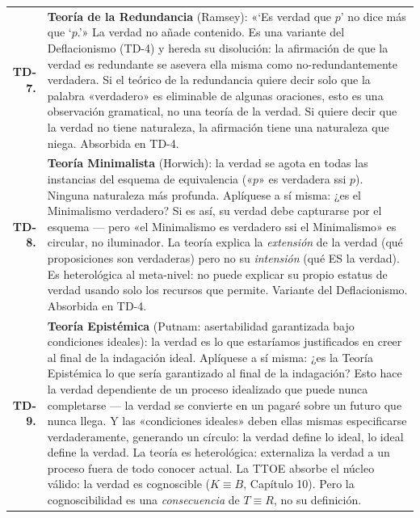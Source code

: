 \documentclass[10pt, openany, oneside]{book}
\renewcommand{\footnotesize}{\fontsize{8.5}{11}\selectfont}
\begin{document}
{\footnotesize
\noindent\begin{tabular}{r p{}}
\textbf{TD-7.} & \textbf{Teoría de la Redundancia} (Ramsey): «`Es verdad que $p$' no dice más que `$p$.'» La verdad no añade contenido. Es una variante del Deflacionismo (TD-4) y hereda su disolución: la afirmación de que la verdad es redundante se asevera ella misma como no-redundantemente verdadera. Si el teórico de la redundancia quiere decir solo que la palabra «verdadero» es eliminable de algunas oraciones, esto es una observación gramatical, no una teoría de la verdad. Si quiere decir que la verdad no tiene naturaleza, la afirmación tiene una naturaleza que niega. Absorbida en TD-4. \\[0.3em]
\textbf{TD-8.} & \textbf{Teoría Minimalista} (Horwich): la verdad se agota en todas las instancias del esquema de equivalencia («$p$» es verdadera ssi $p$). Ninguna naturaleza más profunda. Aplíquese a sí misma: ¿es el Minimalismo verdadero? Si es así, su verdad debe capturarse por el esquema --- pero «el Minimalismo es verdadero ssi el Minimalismo» es circular, no iluminador. La teoría explica la \textit{extensión} de la verdad (qué proposiciones son verdaderas) pero no su \textit{intensión} (qué ES la verdad). Es heterológica al meta-nivel: no puede explicar su propio estatus de verdad usando solo los recursos que permite. Variante del Deflacionismo. Absorbida en TD-4. \\[0.3em]
\textbf{TD-9.} & \textbf{Teoría Epistémica} (Putnam: asertabilidad garantizada bajo condiciones ideales): la verdad es lo que estaríamos justificados en creer al final de la indagación ideal. Aplíquese a sí misma: ¿es la Teoría Epistémica lo que sería garantizado al final de la indagación? Esto hace la verdad dependiente de un proceso idealizado que puede nunca completarse --- la verdad se convierte en un pagaré sobre un futuro que nunca llega. Y las «condiciones ideales» deben ellas mismas especificarse verdaderamente, generando un círculo: la verdad define lo ideal, lo ideal define la verdad. La teoría es heterológica: externaliza la verdad a un proceso fuera de todo conocer actual. La TTOE absorbe el núcleo válido: la verdad es cognoscible ($K \equiv B$, Capítulo 10). Pero la cognoscibilidad es una \textit{consecuencia} de $T \equiv R$, no su definición. \\[0.3em]
\end{tabular}
}

\vspace{0.5em}
\end{document}
